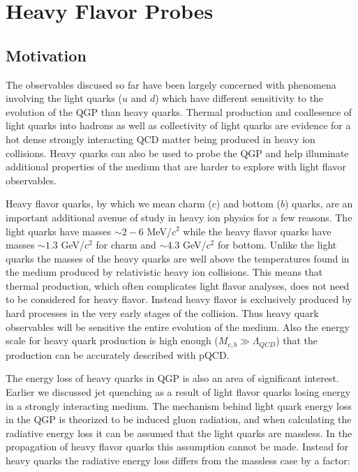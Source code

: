 \section{Heavy Flavor Probes}

\subsection{Motivation}

The observables discused so far have been largely concerned with phenomena involving the light quarks ($u$ and $d$) which have different sensitivity to the evolution of the QGP than heavy quarks. Thermal production and coallesence of light quarks into hadrons as well as collectivity of light quarks are evidence for a hot dense strongly interacting QCD matter being produced in heavy ion collisions. Heavy quarks can also be used to probe the QGP and help illuminate additional properties of the medium that are harder to explore with light flavor observables. 

Heavy flavor quarks, by which we mean charm ($c$) and bottom ($b$) quarks, are an important additional avenue of study in heavy ion physics for a few reasons. The light quarks have masses $\sim2-6$ MeV/$c^2$ while the heavy flavor quarks have masses $\sim1.3$ GeV/$c^2$ for charm and $\sim4.3$ GeV/$c^2$ for bottom. Unlike the light quarks the masses of the heavy quarks are well above the temperatures found in the medium produced by relativistic heavy ion collisions. This means that thermal production, which often complicates light flavor analyses, does not need to be considered for heavy flavor. Instead heavy flavor is exclusively produced by hard processes in the very early stages of the collision. Thus heavy quark observables will be sensitive the entire evolution of the medium. Also the energy scale for heavy quark production is high enough ($M_{c,b} \gg \Lambda_{QCD}$) that the production can be accurately described with pQCD.

The energy loss of heavy quarks in QGP is also an area of significant interest. Earlier we discussed jet quenching as a result of light flavor quarks losing energy in a strongly interacting medium. The mechanism behind light quark energy loss in the QGP is theorized to be induced gluon radiation, and when calculating the radiative energy loss it can be assumed that the light quarks are massless. In the propagation of heavy flavor quarks this assumption cannot be made. Instead for heavy quarks the radiative energy loss differs from the massless case by a factor:

